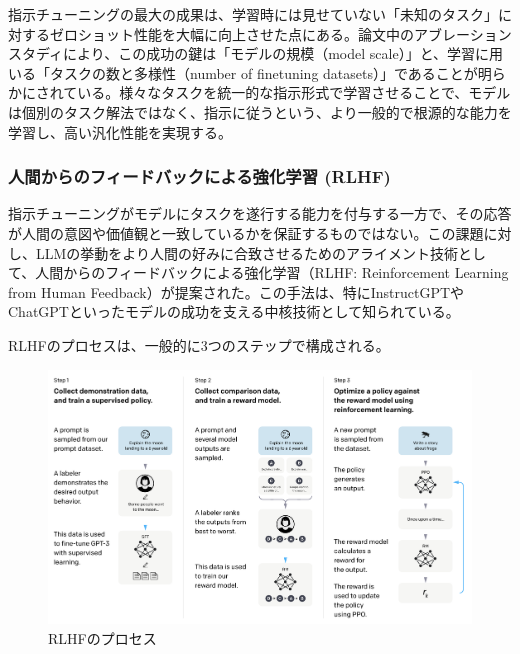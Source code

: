 \documentclass[a4paper,11pt]{jreport}
\begin{document}
指示チューニングの最大の成果は、学習時には見せていない「未知のタスク」に対するゼロショット性能を大幅に向上させた点にある。論文中のアブレーションスタディにより、この成功の鍵は「モデルの規模（model scale）」と、学習に用いる「タスクの数と多様性（number of finetuning datasets）」であることが明らかにされている。様々なタスクを統一的な指示形式で学習させることで、モデルは個別のタスク解法ではなく、指示に従うという、より一般的で根源的な能力を学習し、高い汎化性能を実現する。

\subsubsection{人間からのフィードバックによる強化学習 (RLHF)}
指示チューニングがモデルにタスクを遂行する能力を付与する一方で、その応答が人間の意図や価値観と一致しているかを保証するものではない。この課題に対し、LLMの挙動をより人間の好みに合致させるためのアライメント技術として、人間からのフィードバックによる強化学習（RLHF: Reinforcement Learning from Human Feedback）が提案された\cite{InstructGPT}。この手法は、特にInstructGPTやChatGPTといったモデルの成功を支える中核技術として知られている。

RLHFのプロセスは、一般的に3つのステップで構成される\cite{InstructGPT}。

\begin{figure}[t]
  \centering
  \includegraphics[width=\linewidth]{./fig/rlhf_fig2.png}
  \caption{RLHFのプロセス\cite{InstructGPT}}
  \label{fig:rlhf_process}
\end{figure}
\end{document}
